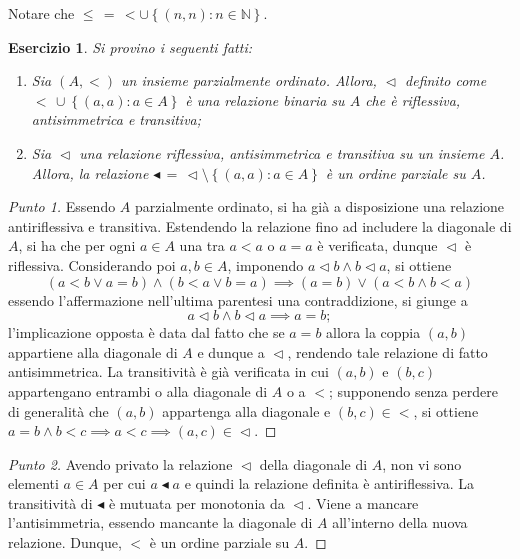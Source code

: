 \documentclass[fontsize = 11 pt, paper=A4, oneside, index=totoc, hyperref]{book}
\theoremstyle{definition}
\theoremstyle{plain}
\newtheorem{exe}{Esercizio}[section]
\newcommand{\N}{\mathbb{N}}
\newcommand{\order}{\vartriangleleft}
\begin{document}
Notare che \(\le\, =\, < \cup \left\lbrace (n,n) \colon n \in \N \right\rbrace\).

\begin{exe}
  Si provino i seguenti fatti:
  \begin{enumerate}
    \item Sia \((A, <)\) un insieme parzialmente ordinato. Allora, \(\order\) definito come  \(<\,\cup \left\lbrace (a,a) \colon a \in A \right\rbrace\) è una relazione binaria su \(A\) che è riflessiva, antisimmetrica e transitiva;
    \item Sia \(\order\) una relazione riflessiva, antisimmetrica e transitiva su un insieme \(A\). Allora, la relazione \(\blacktriangleleft\, =\, \order \setminus \left\lbrace (a,a) \colon a \in A \right\rbrace\) è un ordine parziale su \(A\).
  \end{enumerate}
\end{exe}
\begin{proof}[Punto 1]
  Essendo \(A\) parzialmente ordinato, si ha già a disposizione una relazione antiriflessiva e transitiva. Estendendo la relazione fino ad includere la diagonale di \(A\), si ha che per ogni \(a \in A\) una tra \(a < a\) o \(a = a\) è verificata, dunque \(\order\) è riflessiva. Considerando poi \(a, b \in A\), imponendo \(a \order b \land b \order a\), si ottiene
  \[
  (a < b \lor a = b) \land (b < a \lor b = a) \implies (a = b) \lor (a < b \land b < a)
  \]
  essendo l'affermazione nell'ultima parentesi una contraddizione, si giunge a
  \[
  a \order b \land b \order a \implies a = b;
  \]
  l'implicazione opposta è data dal fatto che se \(a = b\) allora la coppia \((a,b)\) appartiene alla diagonale di \(A\) e dunque a \(\order\), rendendo tale relazione di fatto antisimmetrica. La transitività è già verificata in cui \((a,b)\) e \((b,c)\) appartengano entrambi o alla diagonale di \(A\) o a \(<\); supponendo senza perdere di generalità che \((a,b)\) appartenga alla diagonale e \((b,c) \in <\), si ottiene \(a = b \land b < c \implies a < c \implies (a,c) \in \order\).
\end{proof}
\begin{proof}[Punto 2]
Avendo privato la relazione \(\order\) della diagonale di \(A\), non vi sono elementi \(a \in A\) per cui \(a \blacktriangleleft a\) e quindi la relazione definita è antiriflessiva. La transitività di \(\blacktriangleleft\) è mutuata per monotonia da \(\order\). Viene a mancare l'antisimmetria, essendo mancante la diagonale di \(A\) all'interno della nuova relazione. Dunque, \(<\) è un ordine parziale su \(A\).
\end{proof}
\end{document}
